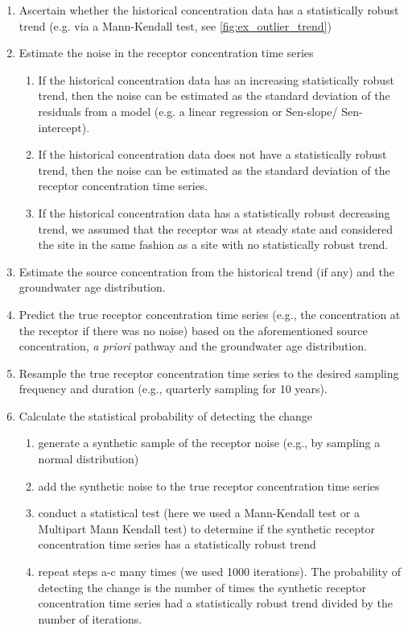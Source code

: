 \begin{enumerate}
    \item Ascertain whether the historical concentration data has a statistically robust trend (e.g. via a Mann-Kendall test, see \autoref{fig:ex_outlier_trend})
    \item Estimate the noise in the receptor concentration time series
    \begin{enumerate}
        \item If the historical concentration data has an increasing statistically robust trend, then the noise can be estimated as the standard deviation of the residuals from a model (e.g. a linear regression or Sen-slope/ Sen-intercept).
        \item If the historical concentration data does not have a statistically robust trend, then the noise can be estimated as the standard deviation of the receptor concentration time series.
        \item If the historical concentration data has a statistically robust decreasing trend, we assumed that the receptor was at steady state and considered the site in the same fashion as a site with no statistically robust trend.
    \end{enumerate}
    \item Estimate the source concentration from the historical trend (if any) and the groundwater age distribution.
    \item Predict the true receptor concentration time series (e.g., the concentration at the receptor if there was no noise) based on the aforementioned source concentration, \textit{a priori} pathway and the groundwater age distribution.
    \item Resample the true receptor concentration time series to the desired sampling frequency and duration (e.g., quarterly sampling for 10 years).
    \item Calculate the statistical probability of detecting the change
    \begin{enumerate}
        \item generate a synthetic sample of the receptor noise (e.g., by sampling a normal distribution)
        \item add the synthetic noise to the true receptor concentration time series
        \item conduct a statistical test (here we used a Mann-Kendall test or a Multipart Mann Kendall test) to determine if the synthetic receptor concentration time series has a statistically robust trend
        \item repeat steps a-c many times (we used 1000 iterations). The probability of detecting the change is the number of times the synthetic receptor concentration time series had a statistically robust trend divided by the number of iterations.
    \end{enumerate}
\end{enumerate}

